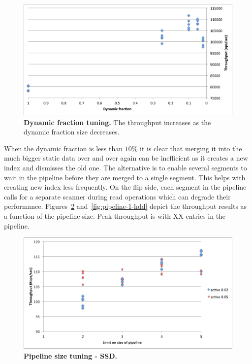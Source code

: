 \begin{figure}[htb]
\includegraphics[width=\figw]{Figs/dynamic-fraction-1.png}
\caption{{\bf Dynamic fraction tuning.} The throughput increases as the dynamic fraction size decreases.
}
\label{fig:dynamic-fraction}
\end{figure}

When the dynamic fraction is less than $10\%$ it is clear that merging it into the much bigger static data over and over again can be inefficient as it creates a new index and dismisses the old one. 
The alternative is to enable several segments to wait in the pipeline before they are merged to a single segment. This helps with creating new index less frequently.
On the flip side, each segment in the pipeline calls for a separate scanner during read operations which can degrade their performance.
Figures~\ref{fig:pipeline-1-ssd} and~\ref{fig:pipeline-1-hdd} depict the throughput results as a function of the pipeline size. Peak throughput is with XX entries in the pipeline.

\begin{figure}[htb]
\includegraphics[width=\figw]{Figs/pipeline-1-ssd.png}
\caption{{\bf Pipeline size tuning - SSD.} 
}
\label{fig:pipeline-1-ssd}
\end{figure}

